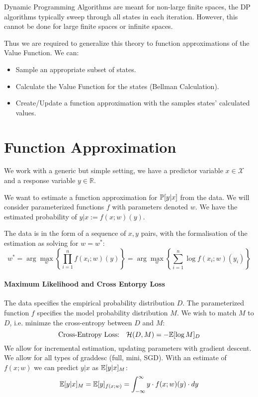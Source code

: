 \documentclass[11pt]{article}
\begin{document}
\maketitle
\thispagestyle{first}

Dynamic Programming Algorithms are meant for non-large finite spaces, the DP algorithms typically sweep through all states in each iteration. However, this cannot be done for large finite spaces or infinite spaces.

Thus we are required to generalize this theory to function approximations of the Value Function. 
We can:
\begin{itemize}
    \item Sample an appropriate subset of states.
    \item Calculate the Value Function for the states (Bellman Calculation).
    \item Create/Update a function approximation with the samples states' calculated values.
\end{itemize}

\section{Function Approximation}
We work with a generic but simple setting, we have a predictor variable $x\in\mathcal{X}$ and a response variable $y\in\mathbb{R}$. 

We want to estimate a function approximation for $\P{y|x}$ from the data. We will consider parameterized functions $f$ with parameters denoted $w$. We have the estimated probability of $y|x := f(x; w)(y)$. 

The data is in the form of a sequence of $x, y$ pairs, with the formalisation of the estimation as solving for $w = w^*$:
$$
    w^*  = \arg\max_w \left\{\prod_{i=1}^n f(x_i;w)(y)\right\} = \arg\max_w \left\{\sum_{i=1}^n\log f(x_i;w)(y_i) \right\}
$$
\paragraph*{Maximum Likelihood and Cross Entorpy Loss}
The data specifies the empirical probability distribution $D$.
The parameterized function $f$ specifies the model probability distribution $M$. We wish to match $M$ to $D$, i.e. minimze the cross-entropy between $D$ and $M$:
$$
    \text{Cross-Entropy Loss:}\quad \mathcal{H}(D, M) = -\E{\log M}_D
$$
We allow for incremental estimation, updating parameters with gradient descent. We allow for all types of graddesc (full, mini, SGD). With an estimate of $f(x; w)$ we can predict $y|x$ as $\E{y|x}_M$:
$$
    \E{y|x}_M = \E{y}_{f(x;w)} = \int_{-\infty}^{\infty} y\cdot f(x;w)(y)\cdot dy
$$
\end{document}
